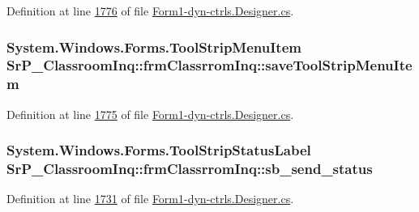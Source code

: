 \-Definition at line \hyperlink{_form1-dyn-ctrls_8_designer_8cs_source_l01776}{1776} of file \hyperlink{_form1-dyn-ctrls_8_designer_8cs_source}{\-Form1-\/dyn-\/ctrls.\-Designer.\-cs}.

\hypertarget{class_sr_p___classroom_inq_1_1frm_classrrom_inq_a7e580a014ae78cc9e8d2ce621a2541f3}{
\subsubsection[{save\-Tool\-Strip\-Menu\-Item}]{\setlength{\rightskip}{0pt plus 5cm}\-System.\-Windows.\-Forms.\-Tool\-Strip\-Menu\-Item {\bf \-Sr\-P\-\_\-\-Classroom\-Inq\-::frm\-Classrrom\-Inq\-::save\-Tool\-Strip\-Menu\-Item}}}
\label{class_sr_p___classroom_inq_1_1frm_classrrom_inq_a7e580a014ae78cc9e8d2ce621a2541f3}


\-Definition at line \hyperlink{_form1-dyn-ctrls_8_designer_8cs_source_l01775}{1775} of file \hyperlink{_form1-dyn-ctrls_8_designer_8cs_source}{\-Form1-\/dyn-\/ctrls.\-Designer.\-cs}.

\hypertarget{class_sr_p___classroom_inq_1_1frm_classrrom_inq_a339bcec3d748bdf74b502189fd7ca9db}{
\subsubsection[{sb\-\_\-send\-\_\-status}]{\setlength{\rightskip}{0pt plus 5cm}\-System.\-Windows.\-Forms.\-Tool\-Strip\-Status\-Label {\bf \-Sr\-P\-\_\-\-Classroom\-Inq\-::frm\-Classrrom\-Inq\-::sb\-\_\-send\-\_\-status}}}
\label{class_sr_p___classroom_inq_1_1frm_classrrom_inq_a339bcec3d748bdf74b502189fd7ca9db}


\-Definition at line \hyperlink{_form1-dyn-ctrls_8_designer_8cs_source_l01731}{1731} of file \hyperlink{_form1-dyn-ctrls_8_designer_8cs_source}{\-Form1-\/dyn-\/ctrls.\-Designer.\-cs}.

